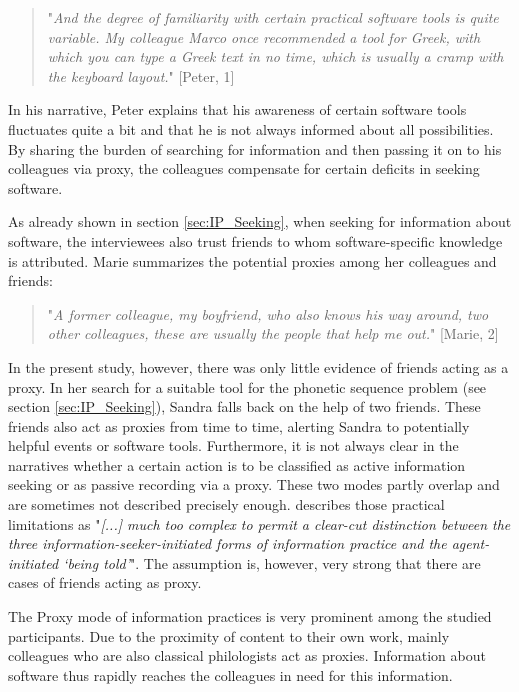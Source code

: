 \documentclass[12pt, a4paper, titlepage, oneside, abstract=true, toc=listof, toc=bibliography]{scrreprt}
\begin{document}
{%
\begin{quotation}
"\textit{And the degree of familiarity with certain practical software tools is quite variable. My colleague Marco once recommended a tool for Greek, with which you can type a Greek text in no time, which is usually a cramp with the keyboard layout.}" [Peter, 1]
\end{quotation}

In his narrative, Peter explains that his awareness of certain software tools fluctuates quite a bit and that he is not always informed about all possibilities. By sharing the burden of searching for information and then passing it on to his colleagues via proxy, the colleagues compensate for certain deficits in seeking software.

As already shown in section \ref{sec:IP_Seeking}, when seeking for information about software, the interviewees also trust friends to whom software-specific knowledge is attributed. Marie summarizes the potential proxies among her colleagues and friends:

\begin{quotation}
"\textit{A former colleague, my boyfriend, who also knows his way around, two other colleagues, these are usually the people that help me out.}" [Marie, 2]
\end{quotation}

In the present study, however, there was only little evidence of friends acting as a proxy. In her search for a suitable tool for the phonetic sequence problem (see section \ref{sec:IP_Seeking}), Sandra falls back on the help of two friends. These friends also act as proxies from time to time, alerting Sandra to potentially helpful events or software tools. Furthermore, it is not always clear in the narratives whether a certain action is to be classified as active information seeking or as passive recording via a proxy. These two modes partly overlap and are sometimes not described precisely enough. \citet[p. 35]{McKenzie2003a} describes those practical limitations as "\textit{[...] much too complex to permit a clear-cut distinction between the three information-seeker-initiated forms of information practice and the agent-initiated `being told’}". The assumption is, however, very strong that there are cases of friends acting as proxy. 

The Proxy mode of information practices is very prominent among the studied participants. Due to the proximity of content to their own work, mainly colleagues who are also classical philologists act as proxies. Information about software thus rapidly reaches the colleagues in need for this information.

}
\end{document}
